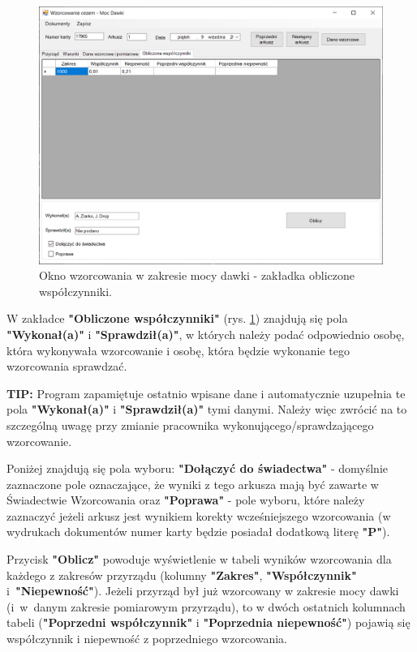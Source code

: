 \begin{figure}[htb]
	\centering
	\includegraphics[width=\columnwidth]{obrazki/Wzorcowanie/moc_dawki/wspolczynniki.png}
	\caption{Okno wzorcowania w zakresie mocy dawki - zakładka obliczone współczynniki.}
	\label{mocWspolczynniki}
\end{figure}

W zakładce \textbf{"Obliczone współczynniki"} (rys. \ref{mocWspolczynniki}) znajdują się pola \textbf{"Wykonał(a)"} i \textbf{"Sprawdził(a)"}, w których należy podać odpowiednio osobę, która wykonywała wzorcowanie i osobę, która będzie wykonanie tego wzorcowania sprawdzać. 

\textbf{TIP:} Program zapamiętuje ostatnio wpisane dane i automatycznie uzupełnia te pola \textbf{"Wykonał(a)"} i \textbf{"Sprawdził(a)"} tymi danymi. Należy więc zwrócić na to szczególną uwagę przy zmianie pracownika wykonującego/sprawdzającego wzorcowanie.

Poniżej znajdują się pola wyboru: \textbf{"Dołączyć do świadectwa"} - domyślnie zaznaczone pole oznaczające, że wyniki z tego arkusza mają być zawarte w Świadectwie Wzorcowania oraz \textbf{"Poprawa"} - pole wyboru, które należy zaznaczyć jeżeli arkusz jest wynikiem korekty wcześniejszego wzorcowania (w wydrukach dokumentów numer karty będzie posiadał dodatkową literę \textbf{"P"}).

Przycisk \textbf{"Oblicz"} powoduje wyświetlenie w tabeli wyników wzorcowania dla każdego z zakresów przyrządu (kolumny \textbf{"Zakres"}, \textbf{"Współczynnik"} i~\textbf{"Niepewność"}). Jeżeli przyrząd był już wzorcowany w zakresie mocy dawki (i~w~danym zakresie pomiarowym przyrządu), to w dwóch ostatnich kolumnach tabeli (\textbf{"Poprzedni współczynnik"} i \textbf{"Poprzednia niepewność"}) pojawią się współczynnik i niepewność z poprzedniego wzorcowania. 

